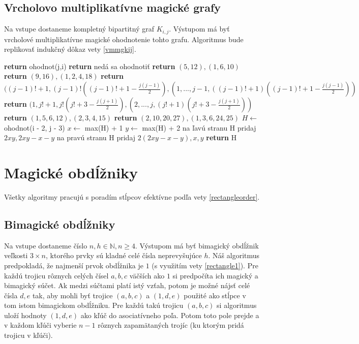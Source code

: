 \subsection{Vrcholovo multiplikatívne magické grafy}

\begin{subalg} Na vstupe dostaneme kompletný bipartitný graf $K_{i,j}$. Výstupom má byť vrcholové multiplikatívne magické ohodnotenie tohto grafu. Algoritmus bude replikovať indukčný dôkaz vety \ref{vmmgkij}.
\end{subalg}

\begin{algorithmic}
	\STATE \textbf{return} ohodnot(j,i)
\ENDIF
{}
	\STATE \textbf{return} nedá sa ohodnotiť
\ENDIF
{}
	\STATE \textbf{return} $(5, 12), (1, 6, 10)$
\ENDIF
{}
	\STATE \textbf{return} $(9, 16), (1, 2, 4, 18)$
\ENDIF
{}
	\STATE \textbf{return} $((j-1)! + 1, (j-1)! ((j-1)! + 1 - \frac{j(j-1)}{2}), (1, ... , j-1, ((j-1)! + 1) ((j-1)! + 1 - \frac{j(j-1)}{2}))$
\ENDIF
{}
	\STATE \textbf{return} $(1, j! + 1, j! (j! + 3 - \frac{j(j+1)}{2}), (2, ... , j, (j! + 1) (j! + 3 - \frac{j(j+1)}{2}))$
\ENDIF
{}
	\STATE \textbf{return} $(1, 5, 6, 12), (2, 3, 4, 15)$
\ENDIF
{}
	\STATE \textbf{return} $(2, 10, 20, 27), (1, 3, 6, 24, 25)$
\ENDIF
\STATE $H \gets$ ohodnot(i - 2, j - 3)
\STATE $x \gets$ max(H) + 1
\STATE $y \gets$ max(H) + 2
\STATE na ľavú stranu H pridaj $2xy, 2xy - x - y$
\STATE na pravú stranu H pridaj $2(2xy - x - y), x, y$
\STATE \textbf{return} H
\end{algorithmic}

\section{Magické obdĺžniky}

Všetky algoritmy pracujú s poradím stĺpcov efektívne podľa vety \ref{rectangleorder}.

\subsection{Bimagické obdĺžniky}

\begin{subalg} Na vstupe dostaneme číslo $n,h \in \mathbb{N}, n \geq 4$. Výstupom má byť bimagický obdĺžnik veľkosti $3 \times n$, ktorého prvky sú kladné celé čísla neprevyšujúce $h$. Náš algoritmus predpokladá, že najmenší prvok obdĺžnika je $1$ (s využitím vety \ref{rectangle1}). Pre každú trojicu rôznych celých čísel $a,b,c$ väčších ako $1$ si predpočíta ich magický a bimagický súčet. Ak medzi súčtami platí istý vzťah, potom je možné nájsť celé čísla $d,e$ tak, aby mohli byť trojice $(a,b,c)$ a $(1,d,e)$ použité ako stĺpce v tom istom bimagickom obdĺžniku. Pre každú takú trojicu $(a,b,c)$ si algoritmus uloží hodnoty $(1,d,e)$ ako kľúč do asociatívneho poľa. Potom toto pole prejde a v každom kľúči vyberie $n-1$ rôznych zapamätaných trojíc (ku ktorým pridá trojicu v kľúči).
\end{subalg}

